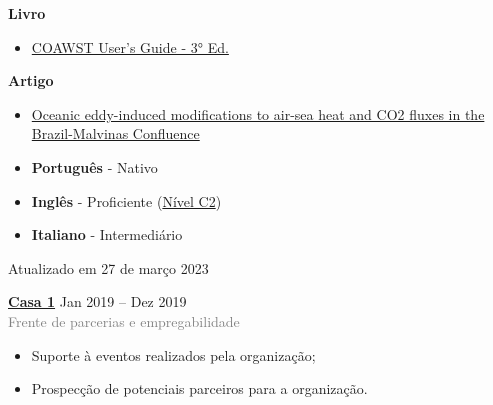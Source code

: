 \documentclass[9pt]{developercv} %
\begin{document}
\begin{minipage}[t]{0.3\textwidth}
	\vspace{-\baselineskip} %
	
	
	\textbf{Livro} %
	\textcolor{gray}{}
	 \begin{itemize}
		\item \small\textcolor{bleu_cite}{\href{http://mtc-m21c.sid.inpe.br/col/sid.inpe.br/mtc-m21c/2020/10.02.15.11/doc/publicacao.pdf}{COAWST User's Guide - 3° Ed.}}
	 \end{itemize}
	 \textbf{Artigo}
	 \begin{itemize}
		\item \small\textcolor{bleu_cite}{\href{https://www.nature.com/articles/s41598-021-89985-9}{Oceanic eddy-induced modifications to air-sea heat and CO2 fluxes in the Brazil-Malvinas Confluence}}
	 \end{itemize}  
\end{minipage}
\hfill
\begin{minipage}[t]{0.3\textwidth}
	\vspace{-\baselineskip} %

	\vspace{-0.3cm}
	\begin{itemize}
	\itemsep0em
	\item \textbf{Português} - Nativo
	\item \textbf{Inglês} - Proficiente (\href{https://www.efset.org/cert/PrWqbW}{\textcolor{bleu_cite}{Nível C2}})
	\item \textbf{Italiano} - Intermediário 
	\end{itemize}
	\vspace{1.3cm}
	
	\centering\tiny Atualizado em 27 de março 2023
\end{minipage}
\hfill
\begin{minipage}[t]{0.3\textwidth}
	\vspace{-\baselineskip} %


	\textbf{\textcolor{bleu_cite}{\href{https://www.casaum.org/}{Casa 1}} } \hspace{1.cm} Jan 2019 --  Dez 2019\\
	\textcolor{gray}{Frente de parcerias e empregabilidade}
	\begin{itemize}
		\item Suporte à eventos realizados pela organização;
		\item Prospecção de potenciais parceiros para a organização.
	\end{itemize}
\end{minipage}


\end{document}
